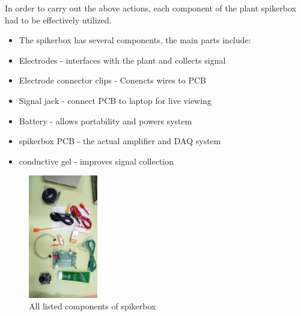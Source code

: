 \documentclass[conference]{IEEEtran}
\begin{document}
    \vspace{-\baselineskip}

   
    In order to carry out the above actions, each component of the 
    plant spikerbox had to be effectively utilized.  
    \vspace{-\baselineskip}
    \begin{itemize}
        \item The spikerbox has several components, the main parts include:
        \item Electrodes - interfaces with the plant and collects signal
        \item Electrode connector clips - Conencts wires to PCB
        \item Signal jack - connect PCB to laptop for live viewing 
        \item Battery - allows portability and powers system
        \item spikerbox PCB - the actual amplifier and DAQ system
        \item conductive gel - improves signal collection
    \end{itemize}
    \begin{figure}[H]
        \begin{center}
            \includegraphics[width=0.27\textwidth,angle=90]{spikecomp}
        \end{center}
        \caption{All listed components of spikerbox}\label{spikecomp}
    \end{figure}
    
\end{document}

